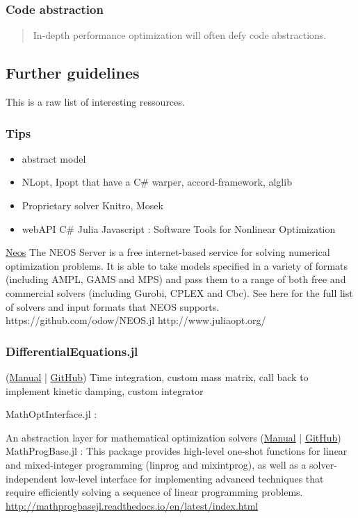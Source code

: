 \subsubsection{Code abstraction}
\blockcquote[p.~155]{Watson2014}{In-depth performance optimization will often defy code abstractions.}

\subsection{Further guidelines}
This is a raw list of interesting ressources.
\subsubsection{Tips}

\begin{itemize}
\item abstract model
\item NLopt, Ipopt that have a C\# warper, accord-framework, alglib
\item Proprietary solver Knitro, Mosek
\item webAPI C\# Julia Javascript
\cite{Moulard2014} : Software Tools for Nonlinear Optimization
\end{itemize}

\href{https://neos-guide.org/}{Neos}
The NEOS Server is a free internet-based service for solving numerical optimization problems. It is able to take models specified in a variety of formats (including AMPL, GAMS and MPS) and pass them to a range of both free and commercial solvers (including Gurobi, CPLEX and Cbc). See here for the full list of solvers and input formats that NEOS supports.
https://github.com/odow/NEOS.jl
http://www.juliaopt.org/

\subsubsection{DifferentialEquations.jl}
(\href{http://docs.juliadiffeq.org/latest/index.html}{Manual} | \href{https://github.com/JuliaDiffEq}{GitHub})
Time integration, custom mass matrix, call back to implement kinetic damping, custom integrator

MathOptInterface.jl :

An abstraction layer for mathematical optimization solvers (\href{http://www.juliaopt.org/MathOptInterface.jl/latest/apimanual.html}{Manual} | \href{https://github.com/JuliaOpt/MathOptInterface.jl}{GitHub})
MathProgBase.jl :
This package provides high-level one-shot functions for linear and mixed-integer programming (linprog and mixintprog), as well as a solver-independent low-level interface for implementing advanced techniques that require efficiently solving a sequence of linear programming problems.
\url{http://mathprogbasejl.readthedocs.io/en/latest/index.html}

